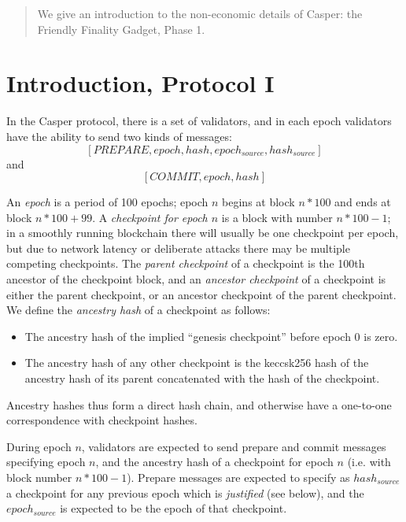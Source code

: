 \documentclass[12pt]{article}
\begin{document}
\maketitle
\begin{abstract}
We give an introduction to the non-economic details of Casper: the Friendly Finality Gadget, Phase 1.
\end{abstract}

\section{Introduction, Protocol I}
In the Casper protocol, there is a set of validators, and in each epoch validators have the ability to send two kinds of messages: $$[PREPARE, epoch, hash, epoch_{source}, hash_{source}]$$ and $$[COMMIT, epoch, hash]$$

An \textit{epoch} is a period of 100 epochs; epoch $n$ begins at block $n * 100$ and ends at block $n * 100 + 99$. A \textit{checkpoint for epoch $n$} is a block with number $n * 100 - 1$; in a smoothly running blockchain there will usually be one checkpoint per epoch, but due to network latency or deliberate attacks there may be multiple competing checkpoints. The \textit{parent checkpoint} of a checkpoint is the 100th ancestor of the checkpoint block, and an \textit{ancestor checkpoint} of a checkpoint is either the parent checkpoint, or an ancestor checkpoint of the parent checkpoint. We define the \textit{ancestry hash} of a checkpoint as follows:

\begin{itemize}
\item The ancestry hash of the implied ``genesis checkpoint'' before epoch 0 is zero.
\item The ancestry hash of any other checkpoint is the keccsk256 hash of the ancestry hash of its parent concatenated with the hash of the checkpoint.
\end{itemize}

Ancestry hashes thus form a direct hash chain, and otherwise have a one-to-one correspondence with checkpoint hashes.

During epoch $n$, validators are expected to send prepare and commit messages specifying epoch $n$, and the ancestry hash of a checkpoint for epoch $n$ (i.e. with block number $n * 100 - 1$). Prepare messages are expected to specify as $hash_{source}$ a checkpoint for any previous epoch which is \textit{justified} (see below), and the $epoch_{source}$ is expected to be the epoch of that checkpoint.
\end{document}
